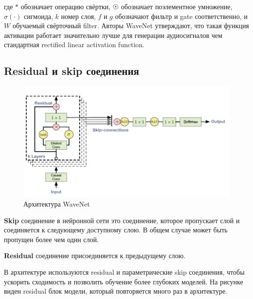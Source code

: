 \documentclass[../diploma.tex]{subfiles}
\begin{document}
где $*$ обозначает операцию свёртки, $\astrosun$ обозначает поэлементное умножение, $\sigma(\cdot)$ сигмоида, $k$ номер слоя, $f$ и $g$ обозначают фильтр и gate соответственно, и $W$ обучаемый свёрточный filter. Авторы WaveNet утверждают, что такая функция активации работает значительно лучше для генерации аудиосигналов чем стандартная rectified linear activation function.

\newpage
\subsection{Residual и skip соединения}

\begin{figure}[ht!]
  \centering
  \includegraphics[scale=0.35]{img/wavenet}
  \caption{Архитектура WaveNet}
  \label{fig:wavenet_arch}
\end{figure}

\begin{definition}
\textbf{Skip} соединение в нейронной сети это соединение, которое пропускает слой и соединяется к следующему доступному слою. В общем случае может быть пропущен более чем один слой.
\end{definition}

\begin{definition}
\textbf{Residual} соединение присоединяется к предыдущему слою.
\end{definition}

В архитектуре используются residual и параметрические skip соединения, чтобы ускорить сходимость и позволить обучение более глубоких моделей. На рисунке \label{fig:wavenet_arch} виден residual блок модели, который повторяется много раз в архитектуре. 

\newpage
\end{document}
